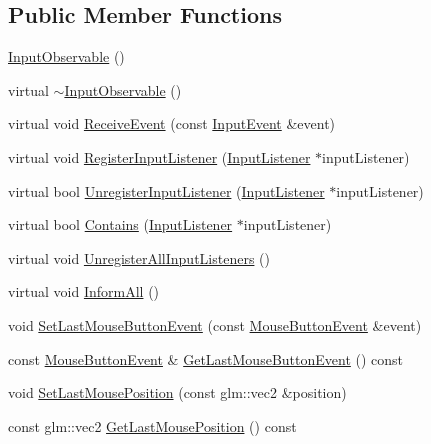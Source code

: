 \subsection*{Public Member Functions}
\begin{DoxyCompactItemize}
\item 
\mbox{\hyperlink{classec_1_1_input_observable_a92422814189d1210f631f4d1378877f3}{Input\+Observable}} ()
\item 
virtual \mbox{\hyperlink{classec_1_1_input_observable_ac261f6a73cfdcd37c276e732cc25f869}{$\sim$\+Input\+Observable}} ()
\item 
virtual void \mbox{\hyperlink{classec_1_1_input_observable_aa043e1a78987c55e03acca7caf13820f}{Receive\+Event}} (const \mbox{\hyperlink{structec_1_1_input_event}{Input\+Event}} \&event)
\item 
virtual void \mbox{\hyperlink{classec_1_1_input_observable_a64505667464dde9b0e031fefe2468c43}{Register\+Input\+Listener}} (\mbox{\hyperlink{classec_1_1_input_listener}{Input\+Listener}} $\ast$input\+Listener)
\item 
virtual bool \mbox{\hyperlink{classec_1_1_input_observable_a06647b619d83edc42f33b23b4db80127}{Unregister\+Input\+Listener}} (\mbox{\hyperlink{classec_1_1_input_listener}{Input\+Listener}} $\ast$input\+Listener)
\item 
virtual bool \mbox{\hyperlink{classec_1_1_input_observable_a7431f35b81b1a34f40605b10739e3ac1}{Contains}} (\mbox{\hyperlink{classec_1_1_input_listener}{Input\+Listener}} $\ast$input\+Listener)
\item 
virtual void \mbox{\hyperlink{classec_1_1_input_observable_a65608ab3e937537a9058acfa9b7e9fde}{Unregister\+All\+Input\+Listeners}} ()
\item 
virtual void \mbox{\hyperlink{classec_1_1_input_observable_a2c3af1f58103d41e21bd95fed9131c5b}{Inform\+All}} ()
\item 
void \mbox{\hyperlink{classec_1_1_input_observable_a4794f86124d9212e4055e8210c301cba}{Set\+Last\+Mouse\+Button\+Event}} (const \mbox{\hyperlink{structec_1_1_mouse_button_event}{Mouse\+Button\+Event}} \&event)
\item 
const \mbox{\hyperlink{structec_1_1_mouse_button_event}{Mouse\+Button\+Event}} \& \mbox{\hyperlink{classec_1_1_input_observable_a0bcd5b8b0dcc5c4eb7da52a9b26daa84}{Get\+Last\+Mouse\+Button\+Event}} () const
\item 
void \mbox{\hyperlink{classec_1_1_input_observable_a6884c5c8175136fa379086a0abc1d751}{Set\+Last\+Mouse\+Position}} (const glm\+::vec2 \&position)
\item 
const glm\+::vec2 \mbox{\hyperlink{classec_1_1_input_observable_a1c76c19bfc7c610090ca4f933506d45d}{Get\+Last\+Mouse\+Position}} () const
\end{DoxyCompactItemize}
